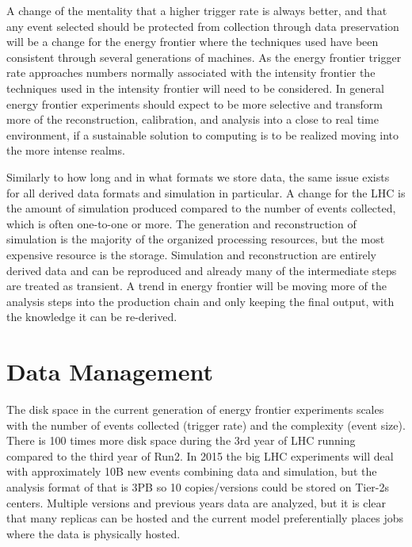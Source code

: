 A change of the mentality that a higher trigger rate is always better, and that any event selected should be protected from collection through data preservation will be a change for the energy frontier where the techniques used have been consistent through several generations of machines.   As the energy frontier trigger rate approaches numbers normally associated with the intensity frontier the techniques used in the intensity frontier will need to be considered.   In general energy frontier experiments should expect to be more selective and transform more of the reconstruction, calibration, and analysis into a close to real time environment, if a sustainable solution to computing is to be realized moving into the more intense realms.

Similarly to how long and in what formats we store data, the same issue exists for all derived data formats and simulation in particular.    A change for the LHC is the amount of simulation produced compared to the number of events collected, which is often one-to-one or more.   The generation and reconstruction of simulation is the majority of the organized processing resources, but the most expensive resource is the storage.   Simulation and reconstruction are entirely derived data and can be reproduced and already many of the intermediate steps are treated as transient.    A trend in energy frontier will be moving more of the analysis steps into the production chain and only keeping the final output, with the knowledge it can be re-derived.  


\section{Data Management}
\label{sec:comp-dm}


The disk space in the current generation of energy frontier experiments scales with the number of events collected (trigger rate) and the complexity (event size).   There is 100 times more disk space during the 3rd year of LHC running compared to the third year of Run2.   In 2015 the big LHC experiments will deal with approximately 10B new events combining data and simulation, but the analysis format of that is 3PB so 10 copies/versions could be stored on Tier-2s centers.     Multiple versions and previous years data are analyzed, but it is clear that many replicas can be hosted and the current model preferentially places jobs where the data is physically hosted.

